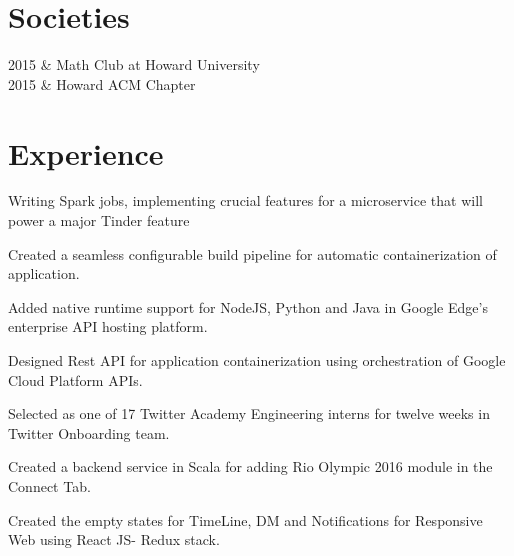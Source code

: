 \documentclass[]{deedy-resume-openfont}
\begin{document}
\begin{minipage}[t]{0.33\textwidth}
\section{Societies} 
2015 & Math Club at Howard University \\
2015 & Howard ACM Chapter \\
\sectionsep

%
%

\end{minipage} 
\hfill
\begin{minipage}[t]{0.66\textwidth} 


\section{Experience}

\vspace{\topsep} %
\begin{tightemize}\item Writing Spark jobs, implementing crucial features for a microservice that will power a major Tinder feature
\end{tightemize}
\sectionsep

\begin{tightemize}
\item Created a seamless configurable build pipeline for automatic containerization of application. \item Added native runtime support for NodeJS, Python and Java in Google Edge's enterprise API hosting platform. \item Designed Rest API for application containerization using orchestration of Google Cloud Platform APIs. \end{tightemize}
\sectionsep

\begin{tightemize}
\item Selected as one of 17 Twitter Academy Engineering interns for twelve weeks in Twitter Onboarding team. \item Created a backend service in Scala for adding Rio Olympic 2016 module in the Connect Tab. \item Created the empty states for TimeLine, DM and Notifications for Responsive Web using React JS- Redux stack. 
\end{tightemize}
\sectionsep


\end{minipage}
\end{document}
